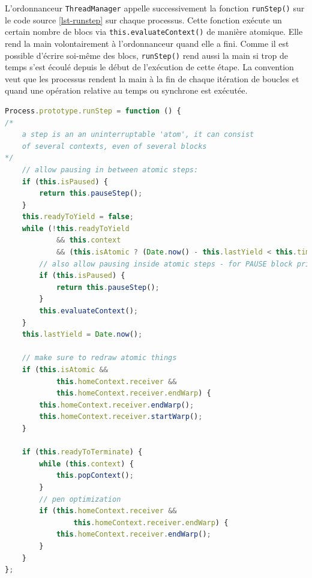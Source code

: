 L'ordonnanceur \texttt{ThreadManager} appelle successivement la fonction \texttt{runStep()} sur le code source \ref{lst-runstep} sur chaque processus. Cette fonction exécute un certain nombre de blocs via \texttt{this.evaluateContext()} de manière atomique. Elle rend la main volontairement à l'ordonnanceur quand elle a fini. Comme il est possible d'écrire soi-même des blocs, \texttt{runStep()} rend aussi la main si trop de temps s'est écoulé depuis le début de l'exécution de cette étape. La convention veut que les processus rendent la main à la fin de chaque itération de boucles et quand une opération relative au temps ou synchrone est exécutée.

\begin{lstlisting}[caption={Fonction \texttt{runStep()} de \texttt{Process}},label=lst-runstep,language=JavaScript]
Process.prototype.runStep = function () {
/*
    a step is an an uninterruptable 'atom', it can consist
    of several contexts, even of several blocks
*/
    // allow pausing in between atomic steps:
    if (this.isPaused) {
        return this.pauseStep();
    }
    this.readyToYield = false;
    while (!this.readyToYield
            && this.context
            && (this.isAtomic ? (Date.now() - this.lastYield < this.timeout) : true) ) {
        // also allow pausing inside atomic steps - for PAUSE block primitive:
        if (this.isPaused) {
            return this.pauseStep();
        }
        this.evaluateContext();
    }
    this.lastYield = Date.now();

    // make sure to redraw atomic things
    if (this.isAtomic &&
            this.homeContext.receiver &&
            this.homeContext.receiver.endWarp) {
        this.homeContext.receiver.endWarp();
        this.homeContext.receiver.startWarp();
    }

    if (this.readyToTerminate) {
        while (this.context) {
            this.popContext();
        }
        // pen optimization
        if (this.homeContext.receiver &&
                this.homeContext.receiver.endWarp) {
            this.homeContext.receiver.endWarp();
        }
    }
};
\end{lstlisting}



